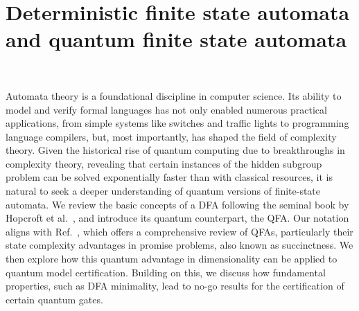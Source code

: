\documentclass[../main.tex]{subfiles}
\begin{document}
\section{Deterministic finite state automata and quantum finite state automata}~\label{preliminaries}


Automata theory is a foundational discipline in computer science. Its ability to model and verify formal languages has not only enabled numerous practical applications, from simple systems like switches and traffic lights to programming language compilers, but, most importantly, has shaped the field of complexity theory. Given the historical rise of quantum computing due to breakthroughs in complexity theory, revealing that certain instances of the hidden subgroup problem can be solved exponentially faster than with classical resources, it is natural to seek a deeper understanding of quantum versions of finite-state automata. We review the basic concepts of a \ac{DFA} following the seminal book by Hopcroft et al.~\cite{hopcroft2001introduction}, and introduce its quantum counterpart, the \ac{QFA}. Our notation aligns with Ref.~\cite{zheng2017promise}, which offers a comprehensive review of \ac{QFA}s, particularly their state complexity advantages in promise problems, also known as succinctness. We then explore how this quantum advantage in dimensionality can be applied to quantum model certification. Building on this, we discuss how fundamental properties, such as \ac{DFA} minimality, lead to no-go results for the certification of certain quantum gates.
\end{document}
